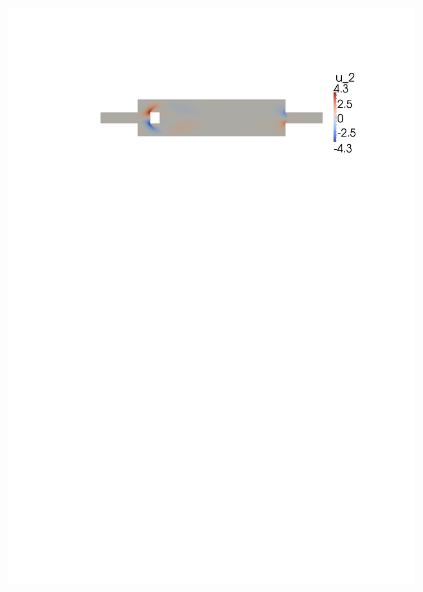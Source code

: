\documentclass{article}
\begin{document}
\begin{figure}[ht]
{   \includegraphics[width=0.96\textwidth,trim=3cm 22.2cm 3cm 3.3cm, clip=true]{fig/example_v2.pdf}\label{fig:example_components3}
}\\
 \subfloat[Pressure $p$.]{
}
\end{figure}
\end{document}
